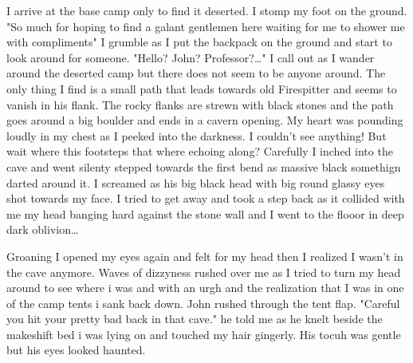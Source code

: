 \newscene

I arrive at the base camp only to find it deserted. I stomp my foot on the ground. "So much for hoping to find a galant gentlemen here waiting for me to shower me with compliments" I grumble as I put the backpack on the ground and start to look around for someone. "Hello? John? Professor?\dots" I call out as I wander around the deserted camp but there does not seem to be anyone around. The only thing I find is a small path that leads towards old Firespitter and seems to vanish in his flank. The rocky flanks are strewn with black stones and the path goes around a big boulder and ends in a cavern opening. My heart was pounding loudly in my chest as I peeked into the darkness. I couldn't see anything! But wait where this footsteps that where echoing along? Carefully I inched into the cave and went silenty stepped towards the first bend as massive black somethign darted around it. I screamed as his big black head with big round glassy eyes shot towards my face. I tried to get away and took a step back as it collided with me my head banging hard against the stone wall and I went to the flooor in deep dark oblivion\dots

\newscene

Groaning I opened my eyes again and felt for my head then I realized I wasn't in the cave anymore. Waves of dizzyness rushed over me as I tried to turn my head around to see where i was and with an urgh and the realization that I was in one of the camp tents i sank back down. John rushed through the tent flap. "Careful you hit your pretty bad back in that cave." he told me as he knelt beside the makeshift bed i was lying on and touched my hair gingerly. His tocuh was gentle but his eyes looked haunted. 

